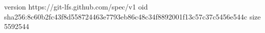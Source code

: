 version https://git-lfs.github.com/spec/v1
oid sha256:8c60b2fc43f8d558724463e7793eb86c48c34f8892001f13c57c37c5456e544c
size 5592544
